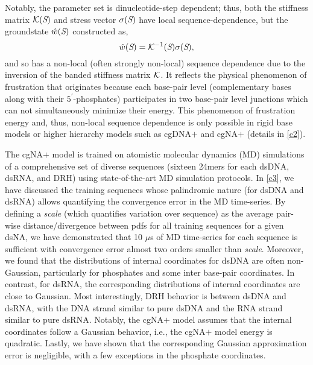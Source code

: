 Notably, the parameter set is dinucleotide-step dependent; thus, both the stiffness matrix ${\mathcal K}({\textit{S}})$ and stress vector $\sigma({\textit{S}})$ have local sequence-dependence, but the groundstate $\hat{w}({\textit{S}})$ constructed as,
\begin{equation}
\hat{w}({\textit{S}}) = {\mathcal K}^{-1}({\textit{S}})\sigma({\textit{S}}),
\end{equation}
and so has a non-local (often strongly non-local) sequence dependence due to the inversion of the banded stiffness matrix ${\mathcal K}$. 
It reflects the physical phenomenon of frustration that originates because each base-pair level (complementary bases along with their $5^\prime$-phosphates) participates in two base-pair level junctions which can not simultaneously minimize their energy.
This phenomenon of frustration energy and, thus, non-local sequence dependence is only possible in rigid base models or higher hierarchy models such as cgDNA$+$ and cgNA$+$ (details in \cref{c2}).

\clearpage

The cgNA$+$ model is trained on atomistic molecular dynamics (MD) simulations of a comprehensive set of diverse sequences (sixteen 24mers for each dsDNA, dsRNA, and DRH) using state-of-the-art MD simulation protocols.
In \cref{c3}, we have discussed the training sequences whose palindromic nature (for dsDNA and dsRNA) allows quantifying the convergence error in the MD time-series.
By defining a \textit{scale} (which quantifies variation over sequence) as the average pair-wise distance/divergence between pdfs for all training sequences for a given dsNA, we have demonstrated that 10 $\mu$s of MD time-series for each sequence is sufficient with convergence error almost two orders smaller than \textit{scale}.
Moreover, we found that the distributions of internal coordinates for dsDNA are often non-Gaussian, particularly for phosphates and some inter base-pair coordinates.
In contrast, for dsRNA, the corresponding distributions of internal coordinates are close to Gaussian.
Most interestingly, DRH behavior is between dsDNA and dsRNA, with the DNA strand similar to pure dsDNA and the RNA strand similar to pure dsRNA.
Notably, the cgNA$+$ model assumes that the internal coordinates follow a Gaussian behavior, i.e., the cgNA$+$ model energy is quadratic. 
Lastly, we have shown that the corresponding Gaussian approximation error is negligible, with a few exceptions in the phosphate coordinates.

